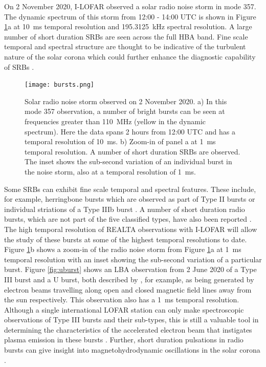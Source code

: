 On 2 November 2020, I-LOFAR observed a solar radio noise storm in mode 357. The dynamic spectrum of this storm from 12:00 - 14:00 UTC is shown in Figure \ref{fig:357_10ms}a at 10~ms temporal resolution and \SI{195.3125}{\kilo \hertz} spectral resolution. A large number of short duration SRBs are seen across the full HBA band. Fine scale temporal and spectral structure are thought to be indicative of the turbulent nature of the solar corona which could further enhance the diagnostic capability of SRBs \citep{Kolotkov2018, Sharykin2018, Reid2021}.

\begin{figure}
    \centering
    \texttt{[image: bursts.png]}
    \caption[Solar radio noise storm observed on 2 November 2020.]{Solar radio noise storm observed on 2 November 2020. a) In this mode 357 observation, a number of bright bursts can be seen at frequencies greater than 110~MHz (yellow in the dynamic spectrum). %
    Here the data spans 2 hours from 12:00 UTC and has a temporal resolution of 10~ms.
    b) Zoom-in of panel a at 1~ms temporal resolution. A number of short duration SRBs are observed. The inset shows the sub-second variation of an individual burst in the noise storm, also at a temporal resolution of 1~ms.}
    \label{fig:357_10ms}
\end{figure}

Some SRBs can exhibit fine scale temporal and spectral features. These include, for example, herringbone bursts which are observed as part of Type II bursts \citep[for example,][]{Carley2015} or individual striations of a Type IIIb burst \citep[for example,][]{Zhang2020}. 
A number of short duration radio bursts, which are not part of the five classified types, have also been reported \citep[for example,][]{Ellis1967, Ellis1969, Melnik2010}. 
The high temporal resolution of REALTA observations with I-LOFAR will allow the study of these bursts at some of the highest temporal resolutions to date. Figure \ref{fig:357_10ms}b shows a zoom-in of the radio noise storm from Figure \ref{fig:357_10ms}a at 1~ms temporal resolution with an inset showing the sub-second variation of a particular burst. Figure \ref{fig:uburst} shows an LBA observation from 2 June 2020 of a Type III burst and a U burst, both described by \cite{Reid2014}, for example, as being generated by electron beams travelling along open and closed magnetic field lines away from the sun respectively. This observation also has a 1~ms temporal resolution. Although a single international LOFAR station can only make spectroscopic observations of Type III bursts and their sub-types, this is still a valuable tool in determining the characteristics of the accelerated electron beam that instigates plasma emission in these bursts \citep{Reid2018}. Further, short duration pulsations in radio bursts can give insight into magnetohydrodynamic oscillations in the solar corona \citep{Carley2019}.

